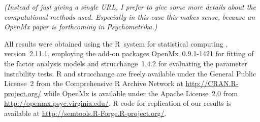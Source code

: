 \documentclass[man]{apa}
\newcommand{\readme}[1]{\emph{\marginpar{README} (#1)}}
\begin{document}
\readme{Instead of just giving a single URL, I prefer to give some more details
about the computational methods used. Especially in this case this makes sense,
because an OpenMx paper is forthcoming in Psychometrika.}

All results were obtained using the {R}~system for statistical computing \cite{R2010},
version~2.11.1, employing the add-on packages {OpenMx}~0.9.1-1421 \cite{BokNea11} for
fitting of the factor analysis models and {strucchange}~1.4.2 \cite{ZeiLei02,Zei06}
for evaluating the parameter instability tests. {R} and {strucchange} are
freely available under the General Public License~2 from the
Comprehensive {R} Archive Network at \url{http://CRAN.R-project.org/}
while {OpenMx} is available under the
Apache License~2.0 from \url{http://openmx.psyc.virginia.edu/}.
R code for replication of our results is
available at \url{http://semtools.R-Forge.R-project.org/}.


\end{document}
